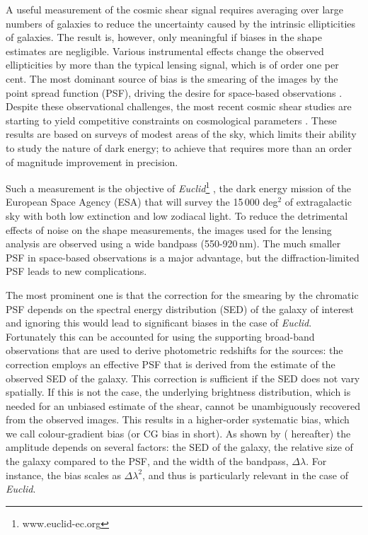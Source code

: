 \documentclass[useAMS,usenatbib]{mnras}
\begin{document}
A useful measurement of the cosmic shear signal requires averaging over large numbers of galaxies
to reduce the uncertainty caused by the intrinsic ellipticities of galaxies. The result is, however, only meaningful if biases in the shape estimates are negligible. Various instrumental effects change the observed ellipticities by more than the typical lensing signal, which is of order one per cent. The most dominant source of bias is the smearing of the images by the point spread function (PSF), driving the desire for space-based observations \citep{Paulin-Henriksson08, Massey13}.
Despite these observational challenges, the most recent cosmic shear studies are starting to yield competitive constraints on cosmological parameters \citep{Heymans13, Jarvis16,2016PhRvD..94b2001A,Jee16,Hildebrandt17,2017arXiv170801538T}. These results are based on surveys of modest areas of the sky, which limits their ability to study the nature of dark energy; to achieve that requires more than an order of magnitude improvement in precision.

Such a measurement is the objective of {\it Euclid}\footnote{www.euclid-ec.org}
\citep{Laureijs11}, the dark energy mission of the European Space
Agency (ESA) that will survey the 15\,000 deg$^2$ of extragalactic sky
with both low extinction and low zodiacal light. To reduce the
detrimental effects of noise on the shape measurements, the images
used for the lensing analysis are observed using a wide bandpass
(550-920\,nm). The much smaller PSF in space-based observations is a
major advantage, but the diffraction-limited PSF leads to new
complications.

The most prominent one is that the correction for the smearing by the chromatic PSF depends on the spectral energy distribution (SED) of the galaxy of interest \citep{Cypriano10, Eriksen17} and ignoring this would lead to significant biases in the case of {\it Euclid}. Fortunately this can be accounted for using the supporting broad-band observations that are used to derive photometric redshifts for the sources: the correction employs an effective PSF that is derived from the estimate of the observed SED of the galaxy. This correction is sufficient if the SED does not vary spatially. If this is not the case, the underlying brightness distribution, which is needed for an unbiased estimate of the shear, cannot be unambiguously recovered from the observed images.
This results in a higher-order systematic bias, which we call colour-gradient bias (or CG bias in short).
As shown by \cite{Semboloni13} ( hereafter) the amplitude depends on several factors: the SED of the galaxy, the relative size of the galaxy compared to the PSF, and the width of the bandpass, $\Delta\lambda$.  For instance, the bias scales as $\Delta\lambda^2$, and thus is particularly relevant in the case of {\it Euclid}.
\end{document}

